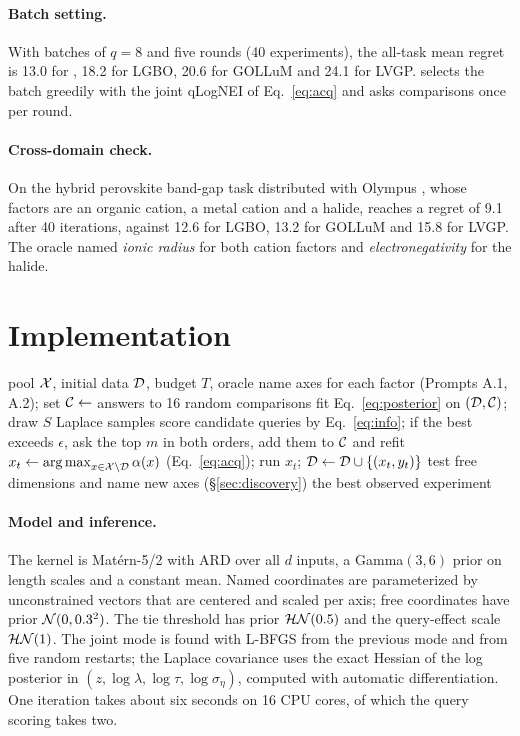 \paragraph{Batch setting.}
With batches of $q=8$ and five rounds (40 experiments), the all-task mean regret is 13.0 for \ours{}, 18.2 for LGBO, 20.6 for GOLLuM and 24.1 for LVGP. \ours{} selects the batch greedily with the joint qLogNEI of Eq.~\eqref{eq:acq} and asks comparisons once per round.

\paragraph{Cross-domain check.}
On the hybrid perovskite band-gap task distributed with Olympus \citep{hase2021olympus}, whose factors are an organic cation, a metal cation and a halide, \ours{} reaches a regret of 9.1 after 40 iterations, against 12.6 for LGBO, 13.2 for GOLLuM and 15.8 for LVGP. The oracle named \emph{ionic radius} for both cation factors and \emph{electronegativity} for the halide.

\section{Implementation}
\label{app:impl}

\begin{algorithm}[t]
\caption{\ours{}}
\label{alg:tacit}
\small
\begin{algorithmic}[1]
\Require pool $\mathcal{X}$, initial data $\mathcal{D}$, budget $T$, oracle
\State name axes for each factor (Prompts A.1, A.2); set $\mathcal{C}\gets$ answers to 16 random comparisons
  \State fit Eq.~\eqref{eq:posterior} on $(\mathcal{D},\mathcal{C})$; draw $S$ Laplace samples
  \State score candidate queries by Eq.~\eqref{eq:info}; if the best exceeds $\epsilon$, ask the top $m$ in both orders, add them to $\mathcal{C}$ and refit
  \State $x_t\gets\operatorname*{arg\,max}_{x\in\mathcal{X}\setminus\mathcal{D}}\alpha(x)$ (Eq.~\eqref{eq:acq}); run $x_t$; $\mathcal{D}\gets\mathcal{D}\cup\{(x_t,y_t)\}$
   test free dimensions and name new axes (\S\ref{sec:discovery}) \EndIf
\EndFor
\State \Return the best observed experiment
\end{algorithmic}
\end{algorithm}

\paragraph{Model and inference.}
The kernel is Mat\'ern-5/2 with ARD over all $d$ inputs, a Gamma$(3,6)$ prior on length scales and a constant mean. Named coordinates are parameterized by unconstrained vectors that are centered and scaled per axis; free coordinates have prior $\mathcal{N}(0,0.3^2)$. The tie threshold has prior $\mathcal{HN}(0.5)$ and the query-effect scale $\mathcal{HN}(1)$. The joint mode is found with L-BFGS from the previous mode and from five random restarts; the Laplace covariance uses the exact Hessian of the log posterior in $(z,\log\lambda,\log\tau,\log\sigma_\eta)$, computed with automatic differentiation. One iteration takes about six seconds on 16 CPU cores, of which the query scoring takes two.

